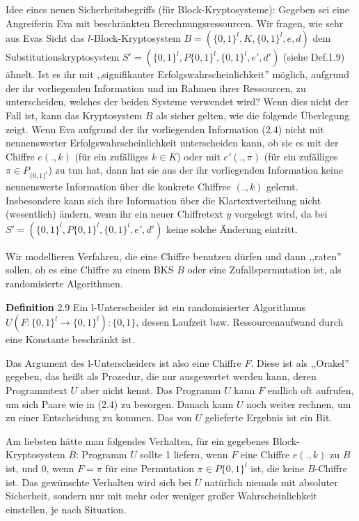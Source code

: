 \documentclass[a4paper]{article}
\begin{document}
\begin{multicols}{3}
    Idee eines neuen Sicherheitsbegriffs (für Block-Kryptosysteme): Gegeben sei eine Angreiferin Eva mit beschränkten Berechnungsressourcen. Wir fragen, wie sehr aus Evas Sicht das $l$-Block-Kryptosystem $B=(\{0,1\}^l,K,\{0,1\}^l,e,d)$ dem Substitutionskryptosystem $S'=(\{0,1\}^l,P\{0,1\}^l,\{0,1\}^l,e',d')$ (siehe Def.1.9) ähnelt. Ist es ihr mit ,,signifikanter Erfolgswahrscheinlichkeit'' möglich, aufgrund der ihr vorliegenden Information und im Rahmen ihrer Ressourcen, zu unterscheiden, welches der beiden Systeme verwendet wird? Wenn dies nicht der Fall ist, kann das Kryptosystem $B$ als sicher gelten, wie die folgende Überlegung zeigt.
    Wenn Eva aufgrund der ihr vorliegenden Information (2.4) nicht mit nennenswerter Erfolgswahrscheinlichkeit unterscheiden kann, ob sie es mit der Chiffre $e(.,k)$ (für ein zufälliges $k\in K$) oder mit $e'(.,\pi)$ (für ein zufälliges $\pi\in P_{\{0,1\}^l}$) zu tun hat, dann hat sie aus der ihr vorliegenden Information keine nennenswerte Information über die konkrete Chiffree $(.,k)$ gelernt. Insbesondere kann sich ihre Information über die Klartextverteilung nicht (wesentlich) ändern, wenn ihr ein neuer Chiffretext $y$ vorgelegt wird, da bei $S'=(\{0,1\}^l,P\{0,1\}^l,\{0,1\}^l,e',d')$ keine solche Änderung eintritt.

    Wir modellieren Verfahren, die eine Chiffre benutzen dürfen und dann ,,raten'' sollen, ob es eine Chiffre zu einem BKS $B$ oder eine Zufallspermutation ist, als randomisierte Algorithmen.

    \textbf{Definition} 2.9 Ein l-Unterscheider ist ein randomisierter Algorithmus $U(F:\{0,1\}^l\rightarrow\{0,1\}^l):\{0,1\}$, dessen Laufzeit bzw. Ressourcenaufwand durch eine Konstante beschränkt ist.

    Das Argument des l-Unterscheiders ist also eine Chiffre $F$. Diese ist als ,,Orakel'' gegeben, das heißt als Prozedur, die nur ausgewertet werden kann, deren Programmtext $U$ aber nicht kennt. Das Programm $U$ kann $F$ endlich oft aufrufen, um sich Paare wie in (2.4) zu besorgen. Danach kann $U$ noch weiter rechnen, um zu einer Entscheidung zu kommen. Das von $U$ gelieferte Ergebnis ist ein Bit.

    Am liebsten hätte man folgendes Verhalten, für ein gegebenes Block-Kryptosystem $B$: Programm $U$ sollte 1 liefern, wenn $F$ eine Chiffre $e(.,k)$ zu $B$ ist, und $0$, wenn $F=\pi$ für eine Permutation $\pi\in P\{0,1\}^l$ ist, die keine $B$-Chiffre ist. Das gewünschte Verhalten wird sich bei $U$ natürlich niemals mit absoluter Sicherheit, sondern nur mit mehr oder weniger großer Wahrscheinlichkeit einstellen, je nach Situation.


\end{multicols}
\end{document}
